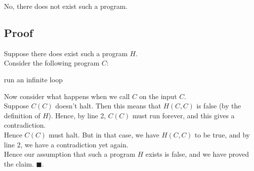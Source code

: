 \documentclass[a4paper]{article}
\newcommand{\nl}{\vspace{0.2cm}\\}
\begin{document}
No, there does not exist such a program.

\subsection{Proof}

Suppose there does exist such a program $H$.\nl
Consider the following program $C$:

\begin{algorithmic}[1]
            \State run an infinite loop
        \Else
            \State \Return
        \EndIf
    \EndFunction
\end{algorithmic}

Now consider what happens when we call $C$ on the input $C$.\nl
Suppose $C(C)$ doesn't halt. Then this means that $H(C, C)$ is false (by the definition of $H$).
Hence, by line 2, $C(C)$ must run forever, and this gives a contradiction.\nl
Hence $C(C)$ must halt. But in that case, we have $H(C, C)$ to be true, and by line $2$, we have a contradiction yet again.\nl
Hence our assumption that such a program $H$ exists is false, and we have proved the claim. $\blacksquare$.
\end{document}
